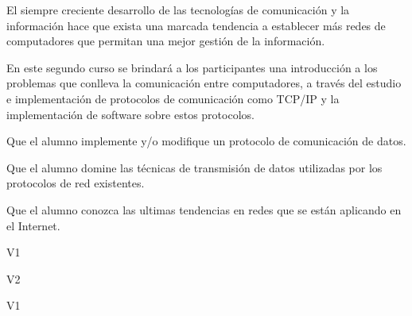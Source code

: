 \begin{syllabus}


\begin{justification}
El siempre creciente desarrollo de las tecnologías de comunicación y la
información hace que exista una marcada tendencia a  establecer
más redes de computadores que permitan una mejor
gestión de la información.

En este segundo curso se brindará a los participantes una introducción a los
problemas que conlleva la comunicación entre computadores, a través del
estudio e implementación de protocolos de comunicación como TCP/IP y
la implementación de software sobre estos protocolos.
\end{justification}

\begin{goals}
\item Que el alumno implemente y/o modifique un protocolo de comunicación de datos.
\item Que el alumno domine las técnicas de transmisión de datos utilizadas por los protocolos de red existentes.
\item Que el alumno conozca las ultimas tendencias en redes que se están aplicando en el Internet.
\end{goals}

\begin{outcomes}{V1}
    \item {}
    \item {}
    \item {}
\end{outcomes}

\begin{outcomes}{V2}
    \item {}
    \item {}
    \item {}
\end{outcomes}

\begin{competences}{V1}
    \item {}
    \item {}
    \item {}
    \item {}
    \item {}
    \item {}
    \item {}
\end{competences}


\end{syllabus}
